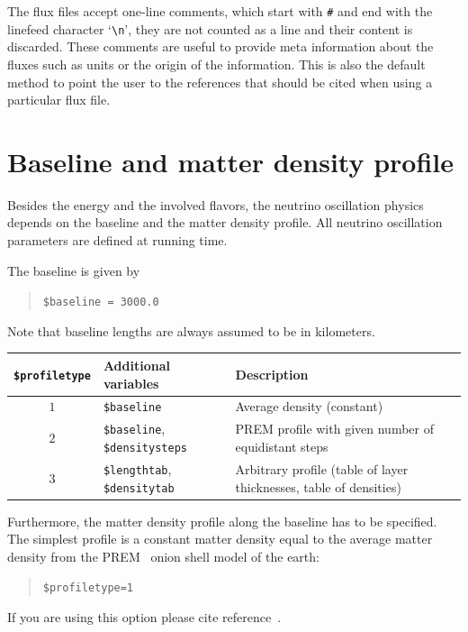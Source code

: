 The flux files accept one-line comments, which start
with {\tt \#} and end with the linefeed character `\verb+\n+', they are
not counted as a line and their content is discarded. These comments
are useful to provide meta information about the fluxes such as units
or the origin of the information. This is also the default method
to point the user to the references that should be cited when using
a particular flux file.

\section{Baseline and matter density profile}

Besides the energy and the involved flavors, the neutrino oscillation
physics depends on the baseline and the matter density profile.
All neutrino oscillation parameters are defined at running time.

The baseline is given by
\begin{quote}
{\tt \$baseline = 3000.0 }
\end{quote}
Note that baseline lengths are always assumed to be in
kilometers.

\begin{table}[t!]
\begin{tabular}{|clp{7cm}|}
\hline
{\tt \$profiletype} & Additional variables & Description \\ 
\hline
$1$ & {\tt \$baseline} & Average density (constant) \\
$2$ & {\tt \$baseline}, {\tt \$densitysteps} & PREM profile with given number of equidistant steps \\
$3$ & {\tt \$lengthtab},  {\tt \$densitytab} & Arbitrary profile (table of layer thicknesses, table of densities) \\
\hline
\end{tabular}
\end{table}


Furthermore, the matter density profile along the baseline
has to be specified. The simplest profile is a constant matter density equal to the average matter density from the PREM~\cite{Stacey} onion shell model of the earth:
\begin{quote}
{\tt \$profiletype=1 }
\end{quote}
%
If you are using this option please cite reference~\cite{Stacey}.

